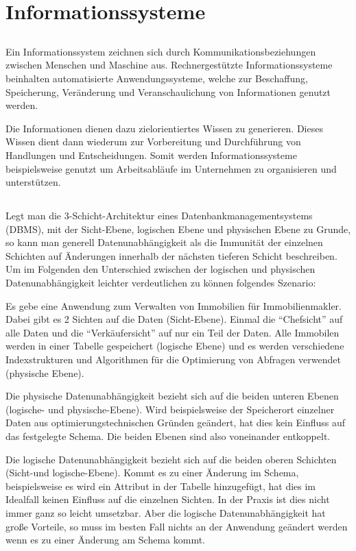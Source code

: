 \documentclass[ngerman]{gdb-aufgabenblatt}
\begin{document}
\section{Informationssysteme}
	\subsection{} %
	Ein Informationssystem zeichnen sich durch Kommunikationsbeziehungen zwischen Menschen und Maschine aus. Rechnergestützte Informationssysteme beinhalten automatisierte Anwendungssysteme, welche zur Beschaffung, Speicherung, Veränderung und Veranschaulichung von Informationen genutzt werden.
	
	Die Informationen dienen dazu zielorientiertes Wissen zu generieren. Dieses Wissen dient dann wiederum zur Vorbereitung und Durchführung von Handlungen und Entscheidungen. Somit werden Informationssysteme beispielsweise genutzt um Arbeitsabläufe im Unternehmen zu organisieren und unterstützen.
	\subsection{} %
	Legt man die 3-Schicht-Architektur eines Datenbankmanagementsystems (DBMS), mit der Sicht-Ebene, logischen Ebene und physischen Ebene zu Grunde, so kann man generell Datenunabhängigkeit als die Immunität der einzelnen Schichten auf Änderungen innerhalb der nächsten tieferen Schicht beschreiben. Um im Folgenden den Unterschied zwischen der logischen und physischen Datenunabhängigkeit leichter verdeutlichen zu können folgendes Szenario:
	
	Es gebe eine Anwendung zum Verwalten von Immobilien für Immobilienmakler. Dabei gibt es 2 Sichten auf die Daten (Sicht-Ebene). Einmal die "`Chefsicht"' auf alle Daten und die "`Verkäufersicht"' auf nur ein Teil der Daten. Alle Immobilen werden in einer Tabelle gespeichert (logische Ebene) und es werden verschiedene Indexstrukturen und Algorithmen für die Optimierung von Abfragen verwendet (physische Ebene).
	
	Die physische Datenunabhängigkeit bezieht sich auf die beiden unteren Ebenen (logische- und physische-Ebene). Wird beispielsweise der Speicherort einzelner Daten aus optimierungstechnischen Gründen geändert, hat dies kein Einfluss auf das festgelegte Schema. Die beiden Ebenen sind also voneinander entkoppelt. 
	
	Die logische Datenunabhängigkeit bezieht sich auf die beiden oberen Schichten (Sicht-und logische-Ebene). Kommt es zu einer Änderung im Schema, beispielsweise es wird ein Attribut in der Tabelle hinzugefügt, hat dies im Idealfall keinen Einfluss auf die einzelnen Sichten. In der Praxis ist dies nicht immer ganz so leicht umsetzbar. Aber die logische Datenunabhängigkeit hat große Vorteile, so muss im besten Fall nichts an der Anwendung geändert werden wenn es zu einer Änderung am Schema kommt. 
\end{document}
